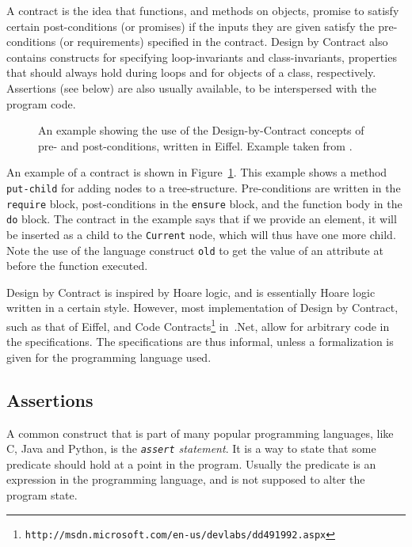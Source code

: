 \documentclass[a4paper,11pt]{kth-mag}
\theoremstyle{definition}
\begin{document}
A contract is the idea that functions, and methods on objects, promise to
satisfy certain post-conditions (or promises) if the inputs they are given
satisfy the pre-conditions (or requirements) specified in the contract. Design
by Contract also contains constructs for specifying loop-invariants and
class-invariants, properties that should always hold during loops and for
objects of a class, respectively. Assertions (see below) are also usually
available, to be interspersed with the program code.

\begin{figure}[h!]
	\begin{center}
	\begin{minipage}{0.7\textwidth}
    \lstset{language=Eiffel}
		
	\end{minipage}
	\end{center}
  \caption{An example showing the use of the Design-by-Contract concepts of
    pre- and post-conditions, written in Eiffel. Example taken from
    \cite{meyer92applyingdbc}.}
	\label{figure-dbc-example}
\end{figure}

An example of a contract is shown in Figure~\ref{figure-dbc-example}. This
example shows a method \texttt{put-child} for adding nodes to a tree-structure.
Pre-conditions are written in the \texttt{require} block, post-conditions in
the \texttt{ensure} block, and the function body in the \texttt{do} block. The
contract in the example says that if we provide an element, it will be inserted
as a child to the \texttt{Current} node, which will thus have one more child.
Note the use of the language construct \texttt{old} to get the value of an
attribute at before the function executed.

Design by Contract is inspired by Hoare logic, and is essentially Hoare logic
written in a certain style. However, most implementation of Design by Contract,
such as that of Eiffel, and Code
Contracts\footnote{\texttt{http://msdn.microsoft.com/en-us/devlabs/dd491992.aspx}}
in~.Net, allow for arbitrary code in the specifications. The specifications are
thus informal, unless a formalization is given for the programming language
used.


\subsection{Assertions}

A common construct that is part of many popular programming languages, like C,
Java and Python, is the \textit{\texttt{assert} statement}. It is a way to
state that some predicate should hold at a point in the program. Usually the
predicate is an expression in the programming language, and is not supposed to
alter the program state.
\end{document}

